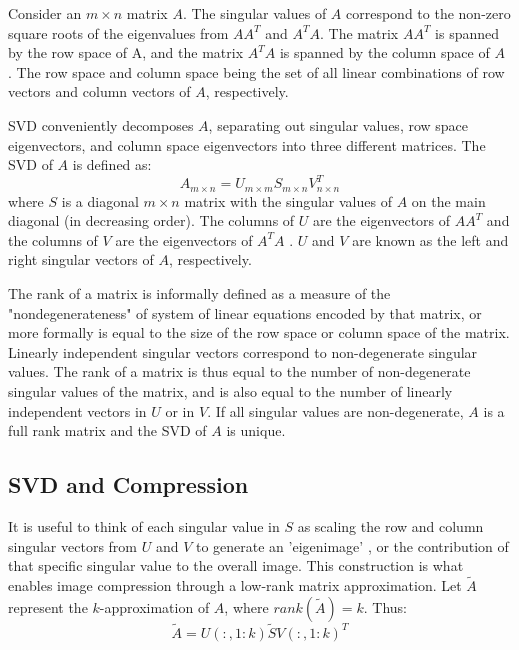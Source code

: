 \documentclass{report}
\begin{document}
Consider an $m \times n$ matrix $A$. The singular values of $A$  correspond to the non-zero square roots of the eigenvalues from $AA^T$ and $A^TA$. The matrix $AA^T$ is spanned by the row space of A, and the matrix $A^TA$ is spanned by the column space of $A$ \cite{using_svd}. The row space and column space being the set of all linear combinations of row vectors and column vectors of $A$, respectively.

SVD conveniently decomposes $A$, separating out singular values, row space eigenvectors, and column space eigenvectors into three different matrices. The SVD of $A$ is defined as:
$$A_{\scriptscriptstyle m \times n} = U_{\scriptscriptstyle m \times m}S_{\scriptscriptstyle m \times n}V_{\scriptscriptstyle n \times n}^T$$
where $S$ is a diagonal $m \times n$ matrix with the singular values of $A$ on the main diagonal (in decreasing order). The columns of $U$ are the eigenvectors of $AA^T$ and the columns of $V$ are the eigenvectors of $A^TA$ \cite{using_svd}. $U$ and $V$ are known as the left and right singular vectors of $A$, respectively.

The rank of a matrix is informally defined as a measure of the "nondegenerateness" of system of linear equations encoded by that matrix, or more formally is equal to the size of the row space or column space of the matrix. Linearly independent singular vectors correspond to non-degenerate singular values.  The rank of a matrix is thus equal to the number of non-degenerate singular values of the matrix, and is also equal to the number of linearly independent vectors in $U$ or in $V$. If all singular values are non-degenerate, $A$ is a full rank matrix and the SVD of $A$ is unique.

\subsection{SVD and Compression}
It is useful to think of each singular value in $S$ as scaling the row and column singular vectors from $U$ and $V$ to generate an 'eigenimage' \cite{svd_image_coding}, or the contribution of that specific singular value to the overall image. This construction is what enables image compression through a low-rank matrix approximation. Let $\tilde{A}$ represent the $k$-approximation of $A$, where $rank(\tilde{A}) = k$. Thus:
$$\tilde{A} = U(:,1:k)\tilde{S}V(:,1:k)^T$$
\end{document}
